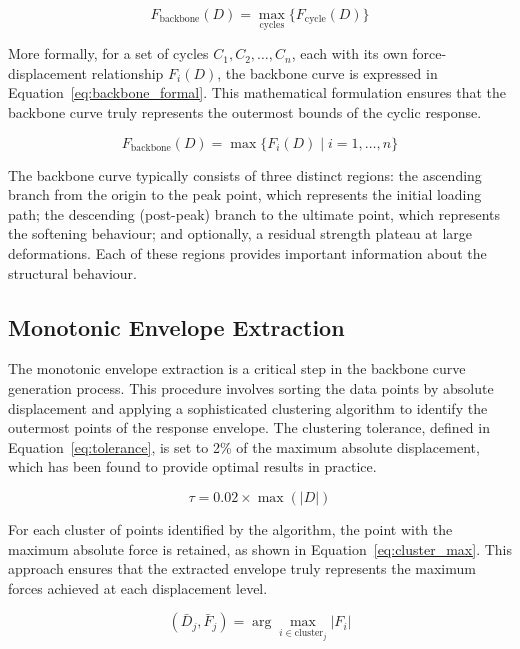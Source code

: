 \documentclass[11pt,a4paper]{article}
\begin{document}
\begin{equation}
F_{\text{backbone}}(D) = \max_{\text{cycles}} \{ F_{\text{cycle}}(D) \}
\label{eq:backbone_def}
\end{equation}

More formally, for a set of cycles \(C_1, C_2, \ldots, C_n\), each with its own force-displacement relationship \(F_i(D)\), the backbone curve is expressed in Equation~\ref{eq:backbone_formal}. This mathematical formulation ensures that the backbone curve truly represents the outermost bounds of the cyclic response.

\begin{equation}
F_{\text{backbone}}(D) = \max\{ F_i(D) \mid i = 1, \ldots, n \}
\label{eq:backbone_formal}
\end{equation}

The backbone curve typically consists of three distinct regions: the ascending branch from the origin to the peak point, which represents the initial loading path; the descending (post-peak) branch to the ultimate point, which represents the softening behaviour; and optionally, a residual strength plateau at large deformations. Each of these regions provides important information about the structural behaviour.

\subsection{Monotonic Envelope Extraction}

The monotonic envelope extraction is a critical step in the backbone curve generation process. This procedure involves sorting the data points by absolute displacement and applying a sophisticated clustering algorithm to identify the outermost points of the response envelope. The clustering tolerance, defined in Equation~\ref{eq:tolerance}, is set to 2\% of the maximum absolute displacement, which has been found to provide optimal results in practice.

\begin{equation}
\tau = 0.02 \times \max(|D|)
\label{eq:tolerance}
\end{equation}

For each cluster of points identified by the algorithm, the point with the maximum absolute force is retained, as shown in Equation~\ref{eq:cluster_max}. This approach ensures that the extracted envelope truly represents the maximum forces achieved at each displacement level.

\begin{equation}
(\bar{D}_j, \bar{F}_j) = \arg\max_{i \in \text{cluster}_j} |F_i|
\label{eq:cluster_max}
\end{equation}
\end{document}
